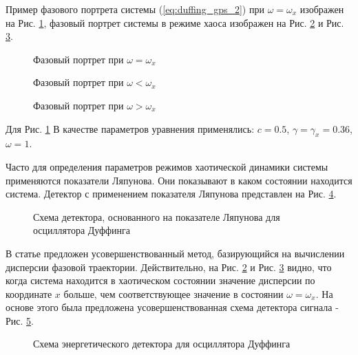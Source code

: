 Пример фазового портрета системы (\ref{eq:duffing_gps_2}) при ${\omega=\omega_{x}}$ изображен на Рис. \ref{pic:duffing_sync},
фазовый портрет системы в режиме хаоса изображен на Рис. \ref{pic:duffing_chaos1} и Рис. \ref{pic:duffing_chaos2}.
\begin{figure}[h]
	\center{}
	\caption{Фазовый портрет при ${\omega =\omega_{x}}$}
	\label{pic:duffing_sync}
\end{figure}
\begin{figure}[h]
	\center{}
	\caption{Фазовый портрет при ${\omega < \omega_{x}}$}
	\label{pic:duffing_chaos1}
\end{figure}
\begin{figure}[h]
	\center{}
	\caption{Фазовый портрет при ${\omega > \omega_{x}}$}
	\label{pic:duffing_chaos2}
\end{figure}
Для Рис. \ref{pic:duffing_sync} В качестве параметров уравнения применялись: $c = 0.5$, $\gamma=\gamma_{x}=0.36$, ${\omega=1}$.

Часто для определения параметров режимов хаотической динамики системы применяются показатели Ляпунова.
Они показывают в каком состоянии находится система.
Детектор с применением показателя Ляпунова представлен на Рис. \ref{pic:chaos_lyapunov}.
\begin{figure}[h]
	\center{}
	\caption{Схема детектора, основанного на показателе Ляпунова для осциллятора Дуффинга}
	\label{pic:chaos_lyapunov}
\end{figure}

В статье \cite{chaos_chen} предложен усовершенствованный метод, базирующийся на вычислении дисперсии
фазовой траектории. Действительно, на Рис. \ref{pic:duffing_chaos1} и Рис. \ref{pic:duffing_chaos2} видно, что когда система находится в хаотическом состоянии значение
дисперсии по координате ${x}$ больше, чем соответствующее значение в состоянии $\omega = \omega_{x}$.
На основе этого была предложена усовершенствованная схема детектора сигнала - Рис. \ref{pic:chaos_energy_detector}.
\begin{figure}[h]
	\center{}
	\caption{Схема энергетического детектора для осциллятора Дуффинга}
	\label{pic:chaos_energy_detector}
\end{figure}


